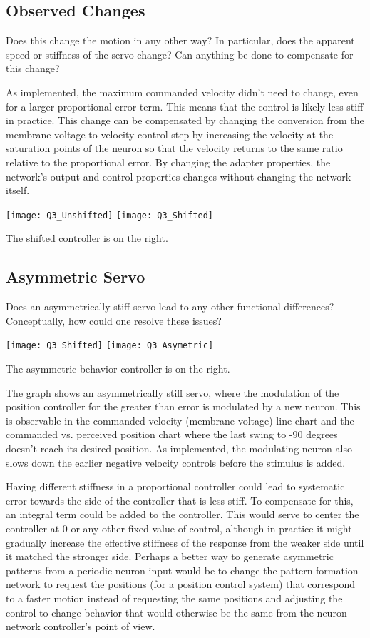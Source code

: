 \documentclass[12pt, letterpaper, oneside, notitlepage, onecolumn]{article}
\begin{document}
\subsection{Observed Changes}

Does this change the motion in any other way? In particular, does the apparent speed or stiffness of
the servo change? Can anything be done to compensate for this change?

As implemented, the maximum commanded velocity didn't need to change, even for a larger proportional error term. This means that the control is likely less stiff in practice. This change can be compensated by changing the conversion from the membrane voltage to velocity control step by increasing the velocity at the saturation points of the neuron so that the velocity returns to the same ratio relative to the proportional error. By changing the adapter properties, the network's output and control properties changes without changing the network itself.

\texttt{[image: Q3\_Unshifted]}
\texttt{[image: Q3\_Shifted]}

The shifted controller is on the right.

\subsection{Asymmetric Servo}

Does an asymmetrically stiff servo lead to any other functional differences? Conceptually, how could one resolve these issues?

\texttt{[image: Q3\_Shifted]}
\texttt{[image: Q3\_Asymetric]}

The asymmetric-behavior controller is on the right.

The graph shows an asymmetrically stiff servo, where the modulation of the position controller for the greater than error is modulated by a new neuron. This is observable in the commanded velocity (membrane voltage) line chart and the commanded vs. perceived position chart where the last swing to -90 degrees doesn't reach its desired position. As implemented, the modulating neuron also slows down the earlier negative velocity controls before the stimulus is added.

Having different stiffness in a proportional controller could lead to systematic error towards the side of the controller that is less stiff. To compensate for this, an integral term could be added to the controller. This would serve to center the controller at 0 or any other fixed value of control, although in practice it might gradually increase the effective stiffness of the response from the weaker side until it matched the stronger side. Perhaps a better way to generate asymmetric patterns from a periodic neuron input would be to change the pattern formation network to request the positions (for a position control system) that correspond to a faster motion instead of requesting the same positions and adjusting the control to change behavior that would otherwise be the same from the neuron network controller's point of view.
\end{document}
